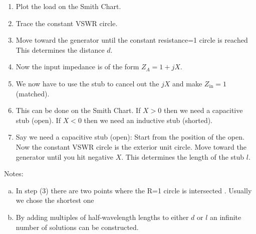 \begin{enumerate}
\item Plot the load on the Smith Chart.
\item Trace the constant VSWR circle.%
\item Move toward the generator until the constant resistance=1 circle is reached This determines the distance \(d\).
\item Now the input impedance is of the form \(Z_A = 1 + j X\).
\item We now have to use the stub to cancel out the \( j X \) and make \( Z_{\textrm{in}} = 1 \) (matched).
\item This can be done on the Smith Chart. If \( X>0 \) then we need a capacitive stub (open). If \( X<0 \) then we need an inductive stub (shorted).
\item Say we need a capacitive stub (open): Start from the position of the open. Now the constant VSWR circle is the exterior unit
circle. Move toward the generator until you hit negative \( X \). This determines the length of the stub \( l \).
\end{enumerate}

Notes:
\begin{enumerate}[(a)]
\item In step (3) there are two points where the R=1 circle is intersected . Usually we chose the shortest one 
\item By adding multiples of half-wavelength lengths to either \(d\) or \(l\) an infinite number of solutions can be constructed.
\end{enumerate}


